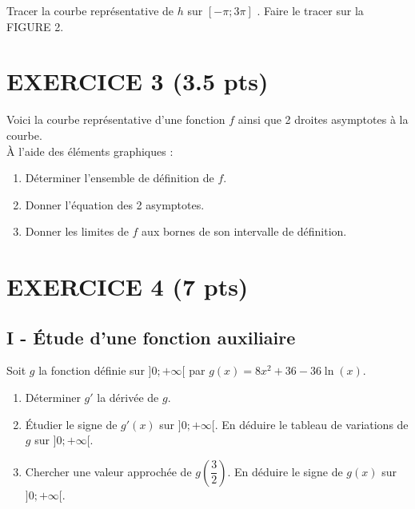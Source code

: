 \documentclass[12pt]{article}
\begin{document}
  Tracer la courbe représentative de $h$ sur $[-\pi ; 3\pi ]$ . Faire le tracer sur la FIGURE 2.

\section*{EXERCICE 3 (3.5 pts) } %

\begin{multicols}{2}

  \begin{figure}[H]
    \centering
  \end{figure}

  Voici la courbe représentative d'une fonction $f$ ainsi que 2 droites asymptotes à la courbe.\\
  À l'aide des éléments graphiques :
  \begin{enumerate}
  \item[1.] Déterminer l'ensemble de définition de $f$.
  \item[2.] Donner l'équation des 2 asymptotes.
  \item[3.] Donner les limites de $f$ aux bornes de son intervalle de définition.
  \end{enumerate}
\end{multicols}

\newpage
\section*{EXERCICE 4 (7 pts) } %

\subsection*{I - Étude d'une fonction auxiliaire}

Soit $g$ la fonction définie sur $] 0 ; + \infty [$ par $g(x) = 8 x^2 + 36 - 36 \ln(x)$.
      \begin{enumerate}
      \item[1.] Déterminer $g'$ la dérivée de $g$. 
      \item[2.] Étudier le signe de $g'(x)$ sur $] 0 ; + \infty [$. En déduire le tableau de variations de $g$ sur $] 0 ; + \infty [$.
    \item[3.] Chercher une valeur approchée de $g \left( \dfrac{3}{2} \right)$. En déduire le signe de $g(x)$ sur $] 0 ; + \infty [$.
      \end{enumerate}
\end{document}
